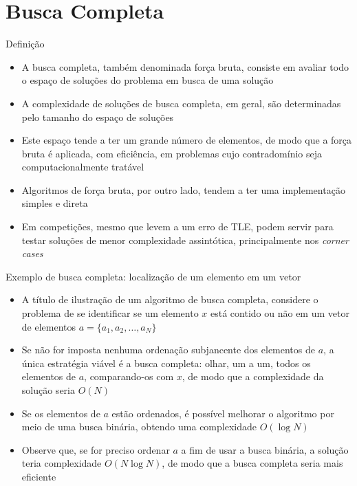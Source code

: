 \section{Busca Completa}

\begin{frame}[fragile]{Definição}

    \begin{itemize}
        \item A busca completa, também denominada força bruta, consiste em avaliar todo o
            espaço de soluções do problema em busca de uma solução

        \item A complexidade de soluções de busca completa, em geral, são determinadas pelo
            tamanho do espaço de soluções

        \item Este espaço tende a ter um grande número de elementos, de modo que a força
            bruta é aplicada, com eficiência, em problemas cujo contradomínio seja 
            computacionalmente tratável

        \item Algoritmos de força bruta, por outro lado, tendem a ter uma implementação simples e
            direta

        \item Em competições, mesmo que levem a um erro de TLE, podem servir para testar soluções
            de menor complexidade assintótica, principalmente nos \textit{corner cases}
    \end{itemize}

\end{frame}

\begin{frame}[fragile]{Exemplo de busca completa: localização de um elemento em um vetor}

    \begin{itemize}
        \item A título de ilustração de um algoritmo de busca completa, considere o problema
            de se identificar se um elemento $x$ está contido ou não em um vetor de elementos
            $a = \lbrace a_1, a_2, \ldots, a_N\rbrace$

        \item Se não for imposta nenhuma ordenação subjancente dos elementos de $a$, a única
            estratégia viável é a busca completa: olhar, um a um, todos os elementos de $a$,
            comparando-os com $x$, de modo que a complexidade da solução seria $O(N)$

        \item Se os elementos de $a$ estão ordenados, é possível melhorar o algoritmo por 
            meio de uma busca binária, obtendo uma complexidade $O(\log N)$

        \item Observe que, se for preciso ordenar $a$ a fim de usar a busca binária, a solução teria
            complexidade $O(N\log N)$, de modo que a busca completa seria mais eficiente
    \end{itemize}

\end{frame}

